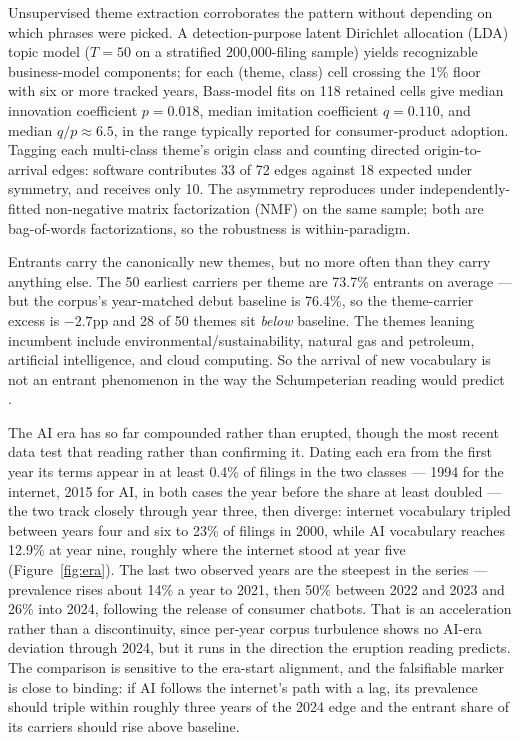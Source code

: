Unsupervised theme extraction corroborates the pattern without depending
on which phrases were picked. A detection-purpose latent Dirichlet allocation
(LDA) topic model ($T = 50$ on a
stratified 200{,}000-filing sample) yields recognizable business-model
components; for each (theme, class) cell crossing the 1\% floor with six
or more tracked years, Bass-model fits \citep{Bass1969} on 118 retained
cells give median innovation coefficient $p = 0.018$, median imitation
coefficient $q = 0.110$, and median $q/p \approx 6.5$, in the range
typically reported for consumer-product adoption. Tagging each
multi-class theme's origin class and counting directed origin-to-arrival
edges: software contributes 33 of 72 edges against 18 expected under
symmetry, and receives only 10. The asymmetry reproduces under
independently-fitted non-negative matrix factorization (NMF) on the same
sample; both are bag-of-words
factorizations, so the robustness is within-paradigm.

Entrants carry the canonically new themes, but no more often than they
carry anything else. The 50
earliest carriers per theme are 73.7\% entrants on average --- but the
corpus's year-matched debut baseline is 76.4\%, so the theme-carrier
excess is $-2.7$pp and 28 of 50 themes sit \emph{below} baseline.
The themes leaning incumbent include environmental/sustainability, natural
gas and petroleum, artificial intelligence, and cloud computing. So the arrival of new vocabulary is not an entrant
phenomenon in the way the Schumpeterian reading would predict
\citep{Schumpeter1942}.

The AI era has so far compounded rather than erupted, though the most recent
data test that reading rather than confirming it. Dating each era from
the first year its terms appear in at least 0.4\% of filings in the two
classes --- 1994 for the internet, 2015 for AI, in both cases the year
before the share at least doubled --- the two track closely through year three, then
diverge: internet vocabulary tripled between years four and six to 23\% of
filings in 2000, while AI vocabulary reaches 12.9\% at year nine, roughly
where the internet stood at year five (Figure~\ref{fig:era}). The last two
observed years are the steepest in the series --- prevalence rises about
14\% a year to 2021, then 50\% between 2022 and 2023 and 26\% into 2024,
following the release of consumer chatbots. That is an acceleration rather
than a discontinuity, since per-year corpus turbulence shows no AI-era
deviation through 2024, but it runs in the direction the eruption reading
predicts. The comparison is sensitive to the era-start alignment, and the
falsifiable marker is close to binding: if AI follows the internet's path
with a lag, its prevalence should triple within roughly three years of the
2024 edge and the entrant share of its carriers should rise above baseline.

